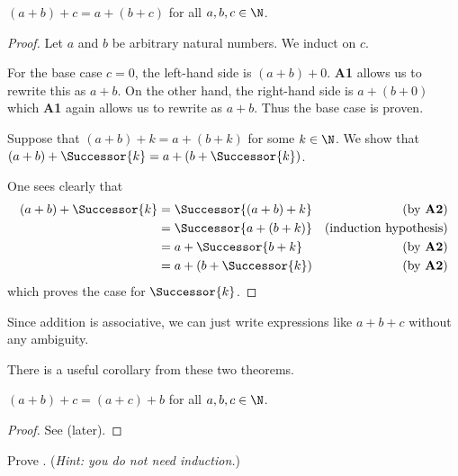 \begin{theorem}\label{theorem:addition-associative-naturals}
    $(a + b) + c = a + (b + c)$ for all $a,b,c \in \N$.
\end{theorem}
\begin{proof}
    Let $a$ and $b$ be arbitrary natural numbers. We induct on $c$.

    For the base case $c = 0$, the left-hand side is $(a + b) + 0$. \textbf{A1} allows us to rewrite this as $a+b$. On the other hand, the right-hand side is $a + (b + 0)$ which \textbf{A1} again allows us to rewrite as $a + b$. Thus the base case is proven.

    Suppose that $(a + b) + k = a + (b + k)$ for some $k \in \N$. We show that $(a + b) + \Successor{k} = a + (b + \Successor{k})$.

    One sees clearly that
    \begin{align*}
        (a + b) + \Successor{k} &= \Successor{(a + b) + k} & (\text{by \textbf{A2}})\\
        &= \Successor{a + (b + k)} & (\text{induction hypothesis})\\
        &= a + \Successor{b + k} & (\text{by \textbf{A2}})\\
        &= a + (b + \Successor{k}) & (\text{by \textbf{A2}})
    \end{align*}
    which proves the case for $\Successor{k}$.
\end{proof}

Since addition is associative, we can just write expressions like $a + b + c$ without any ambiguity.

There is a useful corollary from these two theorems.

\begin{corollary}\label{corollary:right-commutativity-of-addition}
    $(a + b) + c = (a + c) + b$ for all $a, b, c \in \N$.
\end{corollary}
\begin{proof}
    See  (later).
\end{proof}

\begin{exercise}\label{exercise:right-commutativity-of-addition}
    Prove .\newline
    (\textit{Hint: you do not need induction.})
\end{exercise}

